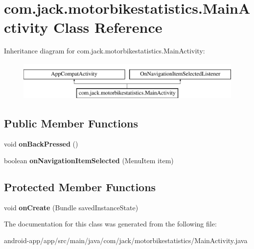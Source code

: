 \hypertarget{classcom_1_1jack_1_1motorbikestatistics_1_1_main_activity}{}\section{com.\+jack.\+motorbikestatistics.\+Main\+Activity Class Reference}
\label{classcom_1_1jack_1_1motorbikestatistics_1_1_main_activity}
Inheritance diagram for com.\+jack.\+motorbikestatistics.\+Main\+Activity\+:\begin{figure}[H]
\begin{center}
\leavevmode
\includegraphics[height=2.000000cm]{classcom_1_1jack_1_1motorbikestatistics_1_1_main_activity}
\end{center}
\end{figure}
\subsection*{Public Member Functions}
\begin{DoxyCompactItemize}
\item 
\mbox{\label{classcom_1_1jack_1_1motorbikestatistics_1_1_main_activity_a7cc508edb3037695e1a75eb342124fbc}} 
void {\bfseries on\+Back\+Pressed} ()
\item 
\mbox{\label{classcom_1_1jack_1_1motorbikestatistics_1_1_main_activity_a38f3fc764869f436e53413ae14590872}} 
boolean {\bfseries on\+Navigation\+Item\+Selected} (Menu\+Item item)
\end{DoxyCompactItemize}
\subsection*{Protected Member Functions}
\begin{DoxyCompactItemize}
\item 
\mbox{\label{classcom_1_1jack_1_1motorbikestatistics_1_1_main_activity_a69fd97053d686c295dc2c58d5c4ffb79}} 
void {\bfseries on\+Create} (Bundle saved\+Instance\+State)
\end{DoxyCompactItemize}


The documentation for this class was generated from the following file\+:\begin{DoxyCompactItemize}
\item 
android-\/app/app/src/main/java/com/jack/motorbikestatistics/Main\+Activity.\+java\end{DoxyCompactItemize}
